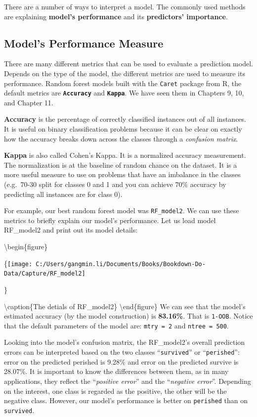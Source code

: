 \documentclass[
]{book}
\begin{document}
There are a number of ways to interpret a model. The commonly used methods are explaining \textbf{model's performance} and its \textbf{predictors' importance}.

\hypertarget{models-performance-measure}{%
\subsection*{Model's Performance Measure}\label{models-performance-measure}}


There are many different metrics that can be used to evaluate a prediction model. Depends on the type of the model, the different metrics are used to measure its performance. Random forest models built with the \texttt{Caret} package from R, the default metrics are \textbf{\texttt{Accuracy}} and \textbf{\texttt{Kappa}}. We have seen them in Chapters 9, 10, and Chapter 11.

\textbf{Accuracy} is the percentage of correctly classified instances out of all instances. It is useful on binary classification problems because it can be clear on exactly how the accuracy breaks down across the classes through a \emph{confusion matrix}.

\textbf{Kappa} is also called Cohen's Kappa. It is a normalized accuracy measurement. The normalization is at the baseline of random chance on the dataset. It is a more useful measure to use on problems that have an imbalance in the classes (e.g.~70-30 split for classes 0 and 1 and you can achieve 70\% accuracy by predicting all instances are for class 0).

For example, our best random forest model was \texttt{RF\_model2}. We can use these metrics to briefly explain our model's performance. Let us load model RF\_model2 and print out its model details:

\textbackslash begin\{figure\}

\{\centering \texttt{[image: C:/Users/gangmin.li/Documents/Books/Bookdown-Do-Data/Capture/RF\_model2]}

\}

\textbackslash caption\{The detials of RF\_model2\}\label{fig:rfmodel2results}
\textbackslash end\{figure\}
We can see that the model's estimated accuracy (by the model construction) is \textbf{83.16\%}. That is \texttt{1-OOB}. Notice that the default parameters of the model are: \texttt{mtry\ =\ 2} and \texttt{ntree\ =\ 500}.

Looking into the model's confusion matrix, the RF\_model2's overall prediction errors can be interpreted based on the two classes ``\texttt{survived}'' or ``\texttt{perished}'': error on the predicted perished is 9.28\% and error on the predicted survive is 28.07\%. It is important to know the differences between them, as in many applications, they reflect the ``\emph{positive error}'' and the ``\emph{negative error}''. Depending on the interest, one class is regarded as the positive, the other will be the negative class. However, our model's performance is better on \texttt{perished} than on \texttt{survived}.
\end{document}
